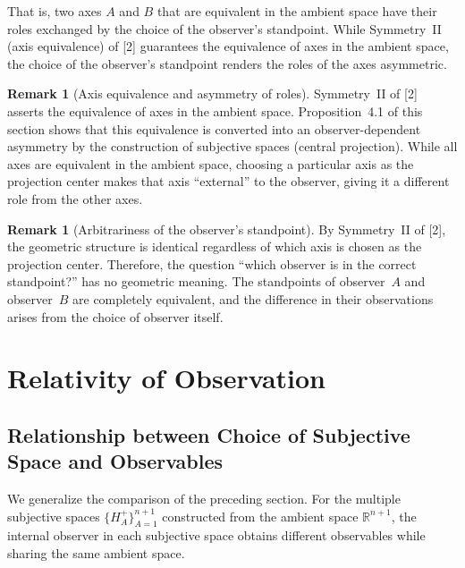 \documentclass[a4paper,11pt]{article}
\theoremstyle{definition}
\newtheorem{remark}[theorem]{Remark}
\begin{document}
That is, two axes \(A\) and \(B\) that are equivalent in the ambient space have their roles exchanged by the choice of the observer's standpoint. While Symmetry~II (axis equivalence) of {[2]} guarantees the equivalence of axes in the ambient space, the choice of the observer's standpoint renders the roles of the axes asymmetric.

\begin{remark}[Axis equivalence and asymmetry of roles]
Symmetry~II of {[2]} asserts the equivalence of axes in the ambient space. Proposition~4.1 of this section shows that this equivalence is converted into an observer-dependent asymmetry by the construction of subjective spaces (central projection). While all axes are equivalent in the ambient space, choosing a particular axis as the projection center makes that axis ``external'' to the observer, giving it a different role from the other axes.
\end{remark}

\begin{remark}[Arbitrariness of the observer's standpoint]
By Symmetry~II of {[2]}, the geometric structure is identical regardless of which axis is chosen as the projection center. Therefore, the question ``which observer is in the correct standpoint?'' has no geometric meaning. The standpoints of observer~\(A\) and observer~\(B\) are completely equivalent, and the difference in their observations arises from the choice of observer itself.
\end{remark}

\section{Relativity of Observation}

\subsection{Relationship between Choice of Subjective Space and Observables}

We generalize the comparison of the preceding section. For the multiple subjective spaces \(\{H_A^+\}_{A=1}^{n+1}\) constructed from the ambient space \(\mathbb{R}^{n+1}\), the internal observer in each subjective space obtains different observables while sharing the same ambient space.
\end{document}
